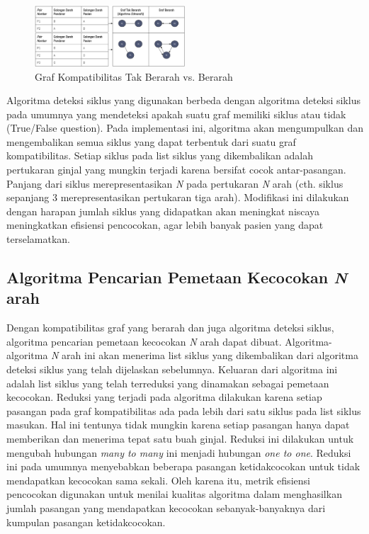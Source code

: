 \documentclass[conference]{IEEEtran}
\begin{document}
\begin{figure}[h]
    \includegraphics[width=0.5\textwidth]{images/Graf berarah vs Tak Berarah.jpg}
    \caption{Graf Kompatibilitas Tak Berarah vs. Berarah}
    \label{undirectedvsdirected}
\end{figure}

Algoritma deteksi siklus yang digunakan berbeda dengan algoritma deteksi siklus pada umumnya yang mendeteksi apakah
suatu graf memiliki siklus atau tidak (True/False question). Pada implementasi ini, algoritma akan mengumpulkan dan
mengembalikan semua siklus yang dapat terbentuk dari suatu graf kompatibilitas. Setiap siklus pada list siklus yang
dikembalikan adalah pertukaran ginjal yang mungkin terjadi karena bersifat cocok antar-pasangan. Panjang dari siklus
merepresentasikan \textit{N} pada pertukaran \textit{N} arah (cth. siklus sepanjang 3 merepresentasikan pertukaran
tiga arah). Modifikasi ini dilakukan dengan harapan jumlah siklus yang didapatkan akan meningkat niscaya meningkatkan
efisiensi pencocokan, agar lebih banyak pasien yang dapat terselamatkan.

\subsection{Algoritma Pencarian Pemetaan Kecocokan \textit{N} arah}
Dengan kompatibilitas graf yang berarah dan juga algoritma deteksi siklus, algoritma pencarian pemetaan kecocokan \textit{N}
arah dapat dibuat. Algoritma-algoritma \textit{N} arah ini akan menerima list siklus yang dikembalikan dari algoritma
deteksi siklus yang telah dijelaskan sebelumnya. Keluaran dari algoritma ini adalah list siklus yang telah terreduksi
yang dinamakan sebagai pemetaan kecocokan. Reduksi yang terjadi pada algoritma dilakukan karena setiap pasangan pada graf
kompatibilitas ada pada lebih dari satu siklus pada list siklus masukan. Hal ini tentunya tidak mungkin karena setiap
pasangan hanya dapat memberikan dan menerima tepat satu buah ginjal. Reduksi ini dilakukan untuk mengubah hubungan
\textit{many to many} ini menjadi hubungan \textit{one to one}. Reduksi ini pada umumnya menyebabkan beberapa pasangan
ketidakcocokan untuk tidak mendapatkan kecocokan sama sekali. Oleh karena itu, metrik efisiensi pencocokan digunakan
untuk menilai kualitas algoritma dalam menghasilkan jumlah pasangan yang mendapatkan kecocokan sebanyak-banyaknya dari
kumpulan pasangan ketidakcocokan. 
\end{document}
